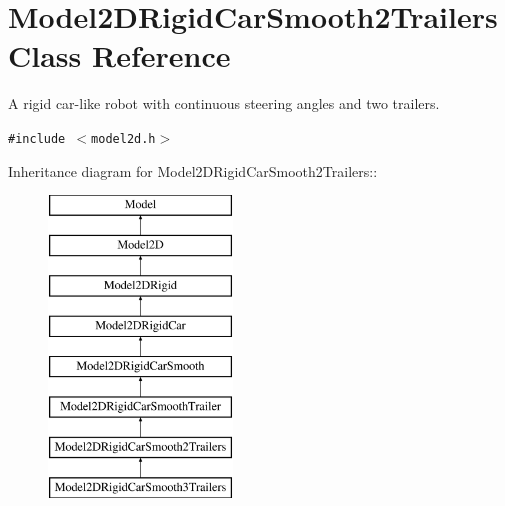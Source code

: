 \section{Model2DRigid\-Car\-Smooth2Trailers  Class Reference}
\label{class_Model2DRigidCarSmooth2Trailers}
A rigid car-like robot with continuous steering angles and two trailers. 


{\tt \#include $<$model2d.h$>$}

Inheritance diagram for Model2DRigid\-Car\-Smooth2Trailers::\begin{figure}[H]
\begin{center}
\leavevmode
\includegraphics[height=8cm]{class_Model2DRigidCarSmooth2Trailers}
\end{center}
\end{figure}
